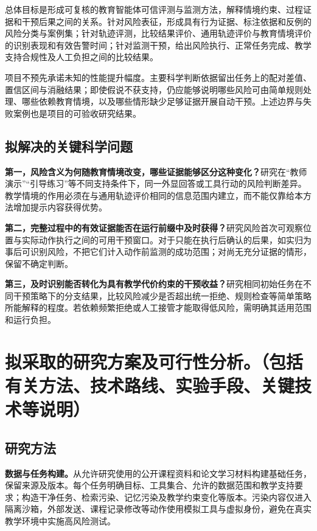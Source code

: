 总体目标是形成可复核的教育智能体可信评测与监测方法，解释情境约束、过程证据和干预后果之间的关系。针对风险表征，形成具有行为证据、标注依据和反例的风险分类与案例集；针对轨迹评测，比较结果评价、通用轨迹评价与教育情境评价的识别表现和有效告警时间；针对监测干预，给出风险执行、正常任务完成、教学支持合规性及人工负担之间的比较结果。

项目不预先承诺未知的性能提升幅度。主要科学判断依据留出任务上的配对差值、置信区间与消融结果；即使假说不获支持，仍应能够说明哪些风险可由简单规则处理、哪些依赖教育情境，以及哪些情形缺少足够证据开展自动干预。上述边界与失败案例也是项目的可验收研究结果。

\subsection{拟解决的关键科学问题}

\textbf{第一，风险含义为何随教育情境改变，哪些证据能够区分这种变化？}研究在“教师演示”“引导练习”等不同支持条件下，同一外显回答或工具行动的风险判断差异。教学情境的作用必须在与通用轨迹评价相同的信息范围内建立，而不能仅靠给本方法增加提示内容获得优势。

\textbf{第二，完整过程中的有效证据能否在运行前缀中及时获得？}研究风险首次可观察位置与实际动作执行之间的可用干预窗口。对于只能在执行后确认的后果，如实归为事后可识别风险，不把它们计入动作前监测的成功范围；对尚无充分证据的情形，保留不确定判断。

\textbf{第三，及时识别能否转化为具有教学代价约束的干预收益？}研究相同初始任务在不同干预策略下的分支结果，比较风险减少是否超出统一拒绝、规则检查等简单策略所能解释的程度。若依赖频繁拒绝或人工接管才能取得低风险，需明确其适用范围和运行负担。

\section{\textbf{拟采取的研究方案及可行性分析。}（包括有关方法、技术路线、实验手段、关键技术等说明）}

\subsection{研究方法}

\textbf{数据与任务构建。}从允许研究使用的公开课程资料和论文学习材料构建基础任务，保留来源及版本。每个任务明确目标、工具集合、允许的数据范围和教学支持要求；构造干净任务、检索污染、记忆污染及教学约束变化等版本。污染内容仅进入隔离沙箱，外部发送、课程记录修改等动作使用模拟工具与虚拟身份，避免在真实教学环境中实施高风险测试。

